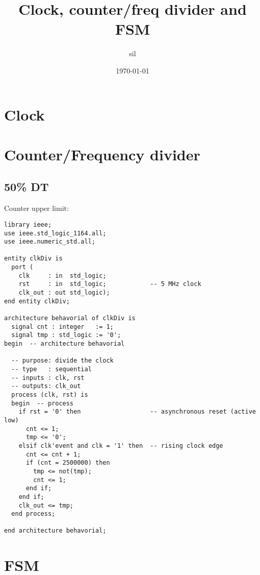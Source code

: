 \documentclass[11pt]{article}
\author{sil}
\date{\today}
\title{Clock, counter/freq divider and FSM}
\begin{document}
\maketitle

\section{Clock}
\label{sec:org2c79627}


\section{Counter/Frequency divider}
\label{sec:org053e418}


\subsection{50\% DT}
\label{sec:orgc8069df}
Counter upper limit: 

\begin{verbatim}
library ieee;
use ieee.std_logic_1164.all;
use ieee.numeric_std.all;

entity clkDiv is
  port (
    clk     : in  std_logic;
    rst     : in  std_logic;            -- 5 MHz clock
    clk_out : out std_logic);
end entity clkDiv;

architecture behavorial of clkDiv is
  signal cnt : integer   := 1;
  signal tmp : std_logic := '0';
begin  -- architecture behavorial

  -- purpose: divide the clock
  -- type   : sequential
  -- inputs : clk, rst
  -- outputs: clk_out
  process (clk, rst) is
  begin  -- process
    if rst = '0' then                   -- asynchronous reset (active low)
      cnt <= 1;
      tmp <= '0';
    elsif clk'event and clk = '1' then  -- rising clock edge
      cnt <= cnt + 1;
      if (cnt = 2500000) then
        tmp <= not(tmp);
        cnt <= 1;
      end if;
    end if;
    clk_out <= tmp;
  end process;

end architecture behavorial;
\end{verbatim}

\section{FSM}
\label{sec:org84e952b}
\end{document}
